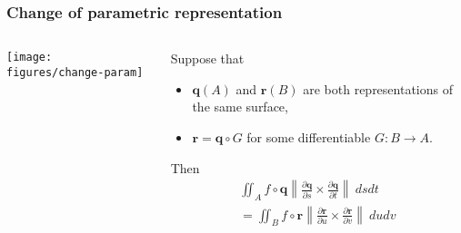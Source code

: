\documentclass[aspectratio=169]{beamer}
\newcommand{\norm}[1]{\left\|#1\right\|} %
\newcommand{\rr}{\mathbf{r}}
\begin{document}
\begin{frame}
    \frametitle{Change of parametric representation}

    \begin{columns}
        \begin{column}{.5\textwidth}
            \texttt{[image: figures/change-param]}
        \end{column}
        \begin{column}{.5\textwidth}
            Suppose that
            \begin{itemize}
                \item \(\mathbf{q}(A)\) and \(\rr(B)\) are both representations of the same surface,
                \item \(\rr = \mathbf{q}\circ G\) for some differentiable \(G:B\to A\).
            \end{itemize}
            Then
            \begin{multline*}
                \iint_{A} f \circ \mathbf{q}  \norm{\frac{\partial  \mathbf{q} }{\partial s} \times \frac{\partial  \mathbf{q} }{\partial t}} \ ds dt \\
                =
                \iint_{B} f \circ \mathbf{r}  \norm{\frac{\partial  \mathbf{r} }{\partial u} \times \frac{\partial  \mathbf{r} }{\partial v}} \ du dv
            \end{multline*}
        \end{column}
    \end{columns}

\end{frame}
\end{document}
